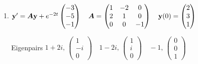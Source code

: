 \documentclass[12pt,letterpaper]{article}
\newcommand{\mat}[1]{\bm{#1}}
\begin{document}
\noindent{}%
\begin{enumerate}
\item
\begingroup\setlength{\arraycolsep}{3pt}
$\vect{y}'=\mat{A}\vect{y}+e^{-2t}\begin{pmatrix}-3\\-5\\-1\end{pmatrix}\quad \mat{A}=\begin{pmatrix}1&-2&0\\2&1&0\\0&0&-1\end{pmatrix}\quad \vect{y}(0)=\begin{pmatrix}2\\3\\1\end{pmatrix}$
\par Eigenpairs $1+2i,\,\begin{pmatrix}1\\-i\\0\end{pmatrix}\quad 1-2i,\,\begin{pmatrix}1\\i\\0\end{pmatrix}\quad -1,\,\begin{pmatrix}0\\0\\1\end{pmatrix}$
\endgroup



\end{enumerate}
\end{document}
